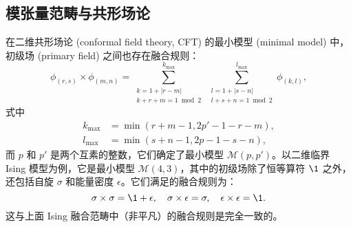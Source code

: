 \subsection{模张量范畴与共形场论}

在二维共形场论 (conformal field theory, CFT) 的最小模型 (minimal model) 中，初级场 (primary field) 之间也存在融合规则\cite{ginsparg1988applied,francesco2012conformal}：
\begin{equation}
  \phi_{(r,s)} \times \phi_{(m,n)}
  = \sum_{\substack{k=1+|r-m| \\ k+r+m=1 \bmod 2}}^{k_{\max}} \,
    \sum_{\substack{l=1+|s-n| \\ l+s+n=1 \bmod 2}}^{l_{\max}} \phi_{(k,l)},
\end{equation}
式中
\begin{equation}
  \begin{aligned}
    k_{\max} &= \min(r+m-1, 2p'-1-r-m), \\
    l_{\max} &= \min(s+n-1, 2p-1-s-n),
  \end{aligned}
\end{equation}
而 $p$ 和 $p'$ 是两个互素的整数，它们确定了最小模型 $\mathcal{M}(p,p')$。以二维临界 Ising 模型为例，它是最小模型 $\mathcal{M}(4,3)$，其中的初级场除了恒等算符 $\1$ 之外，还包括自旋 $\sigma$ 和能量密度 $\epsilon$。它们满足的融合规则为：
\begin{equation}
  \sigma\times\sigma = \1+\epsilon, \quad
  \sigma\times\epsilon = \sigma, \quad
  \epsilon\times\epsilon = \1.
\end{equation}
这与上面 Ising 融合范畴中（非平凡）的融合规则是完全一致的。

